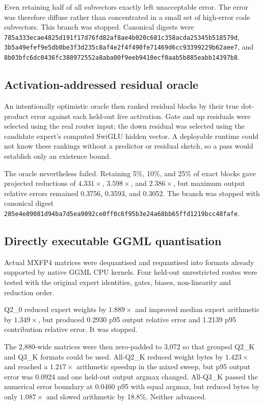 Even retaining half of all subvectors exactly left unacceptable error.  The
error was therefore diffuse rather than concentrated in a small set of
high-error code subvectors.  This branch was stopped.  Canonical digests were
\texttt{785a333ecae4825d191f17d76fd82af8ae4b020c681c358acda25345b518579d},
\texttt{3b5a49efef9e5db0be3f3d235c8af4e2f4f490fe71469d6cc93399229b62aee7},
and
\texttt{8b03bfc6dc0436fc388972552a8aba00f9eeb9410ecf0aab5b885eabb14397b8}.

\subsection{Activation-addressed residual oracle}

An intentionally optimistic oracle then ranked residual blocks by their true
dot-product error against each held-out live activation.  Gate and up residuals
were selected using the real router input; the down residual was selected using
the candidate expert's computed SwiGLU hidden vector.  A deployable runtime
could not know these rankings without a predictor or residual sketch, so a pass
would establish only an existence bound.

The oracle nevertheless failed.  Retaining 5\%, 10\%, and 25\% of exact blocks
gave projected reductions of $4.331\times$, $3.598\times$, and $2.386\times$,
but maximum output relative errors remained 0.3756, 0.3593, and 0.3052.
The branch was stopped with canonical digest
\texttt{285e4e89081d94ba7d5ea9092ce0ff0c6f95b3e24a68bb65ffd1219bcc48fafe}.

\subsection{Directly executable GGML quantisation}

Actual MXFP4 matrices were dequantised and requantised into formats already
supported by native GGML CPU kernels.  Four held-out unrestricted routes were
tested with the original expert identities, gates, biases, non-linearity and
reduction order.

Q2\_0 reduced expert weights by $1.889\times$ and improved median expert
arithmetic by $1.349\times$, but produced 0.2930 p95 output relative error and
1.2139 p95 contribution relative error.  It was stopped.

The 2,880-wide matrices were then zero-padded to 3,072 so that grouped Q2\_K
and Q3\_K formats could be used.  All-Q2\_K reduced weight bytes by
$1.423\times$ and reached a $1.217\times$ arithmetic speedup in the mixed sweep,
but p95 output error was 0.0924 and one held-out output argmax changed.  All-Q3\_K
passed the numerical error boundary at 0.0460 p95 with equal argmax, but reduced
bytes by only $1.087\times$ and slowed arithmetic by 18.8\%.  Neither advanced.

